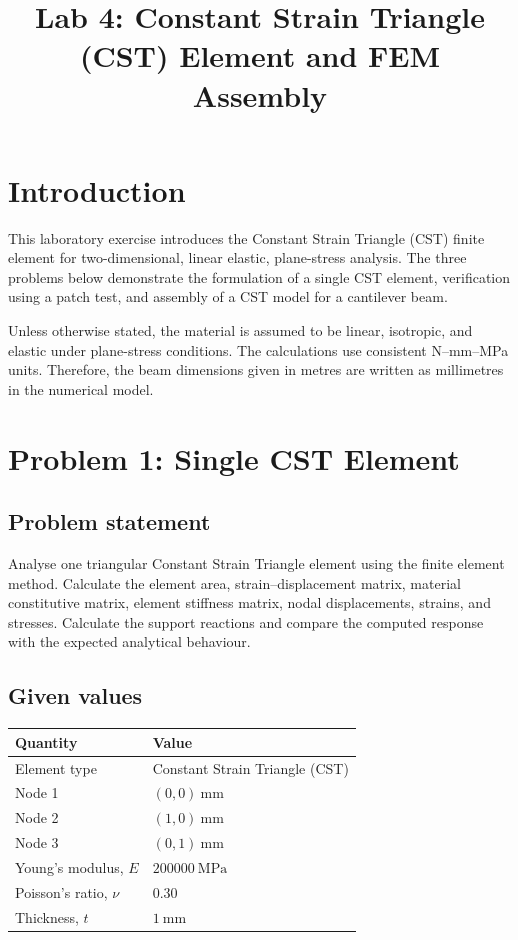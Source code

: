 \documentclass[12pt,a4paper]{article}
\title{Lab 4: Constant Strain Triangle (CST) Element and FEM Assembly}
\author{}
\date{}
\begin{document}
\maketitle

\section*{Introduction}

This laboratory exercise introduces the Constant Strain Triangle (CST)
finite element for two-dimensional, linear elastic, plane-stress analysis.
The three problems below demonstrate the formulation of a single CST
element, verification using a patch test, and assembly of a CST model for a
cantilever beam.

Unless otherwise stated, the material is assumed to be linear, isotropic, and
elastic under plane-stress conditions. The calculations use consistent
N--mm--MPa units. Therefore, the beam dimensions given in metres are written
as millimetres in the numerical model.

\section{Problem 1: Single CST Element}

\subsection*{Problem statement}

Analyse one triangular Constant Strain Triangle element using the finite
element method. Calculate the element area, strain--displacement matrix,
material constitutive matrix, element stiffness matrix, nodal displacements,
strains, and stresses. Calculate the support reactions and compare the
computed response with the expected analytical behaviour.

\subsection*{Given values}

\begin{table}[h!]
\centering
\begin{tabular}{ll}
\toprule
\textbf{Quantity} & \textbf{Value} \\
\midrule
Element type & Constant Strain Triangle (CST) \\
Node 1 & $(0,0)\ \si{\milli\metre}$ \\
Node 2 & $(1,0)\ \si{\milli\metre}$ \\
Node 3 & $(0,1)\ \si{\milli\metre}$ \\
Young's modulus, $E$ & $\SI{200000}{\mega\pascal}$ \\
Poisson's ratio, $\nu$ & $0.30$ \\
Thickness, $t$ & $\SI{1}{\milli\metre}$ \\
\bottomrule
\end{tabular}
\end{table}
\end{document}
